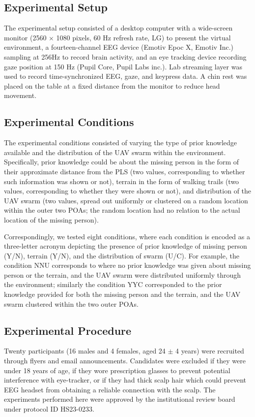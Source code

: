 \documentclass{article}
\begin{document}
	\subsection{Experimental Setup} 
	The experimental setup consisted of a desktop computer with a wide-screen monitor (2560 $\times$ 1080 pixels, 60 Hz refresh rate, LG) to present the virtual environment, a fourteen-channel EEG device (Emotiv Epoc X, Emotiv Inc.) sampling at 256Hz to record brain activity, and an eye tracking device recording gaze position at 150 Hz (Pupil Core, Pupil Labs inc.). Lab streaming layer was used to record time-synchronized  EEG, gaze, and keypress data. A chin rest was placed on the table at a fixed distance from the monitor to reduce head movement.
	
	\subsection{Experimental Conditions}
	The experimental conditions consisted of varying the type of prior knowledge available and the distribution of the UAV swarm within the environment. Specifically, prior knowledge could be about the missing person in the form of their approximate distance from the PLS (two values, corresponding to whether such information was shown or not), terrain in the form of walking trails (two values, corresponding to whether they were shown or not), and distribution of the UAV swarm (two values, spread out uniformly or clustered on a random location within the outer two POAs; the random location had no relation to the actual location of the missing person). 
	
	Correspondingly, we tested eight conditions, where each condition is encoded as a three-letter acronym depicting the presence of prior knowledge of missing person (Y/N), terrain (Y/N), and the distribution of swarm (U/C). For example, the condition NNU corresponds to where no prior knowledge was given about missing person or the terrain, and the UAV swarm were distributed uniformly through the environment; similarly the condition YYC corresponded to the prior knowledge provided for both the missing person and the terrain, and the UAV swarm clustered within the two outer POAs. 
	
	
	
	\subsection{Experimental Procedure}
	
	Twenty participants (16 males and 4 females, aged 24 $\pm$ 4 years) were recruited through flyers and email announcements. Candidates were excluded if they were under 18 years of age, if they wore prescription glasses to prevent potential interference with eye-tracker, or if they had thick scalp hair which could prevent EEG headset from obtaining a reliable connection with the scalp. The experiments performed here were approved by the institutional review board under protocol ID HS23-0233. 
	
\end{document}
